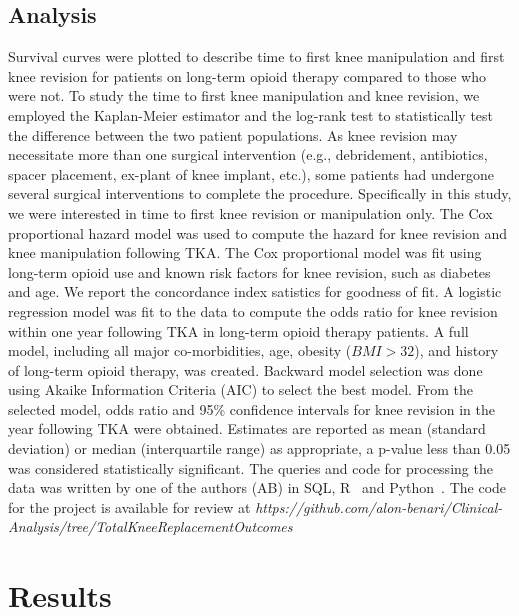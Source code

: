 \documentclass[a4paper]{article}
\begin{document}
\subsection*{Analysis}
Survival curves were plotted to describe time to first knee manipulation and first knee revision for patients on long-term opioid therapy compared to those who were not. To study the time to first knee manipulation and knee revision, we employed the Kaplan-Meier estimator and the log-rank test to statistically test the difference between the two patient populations. As knee revision may necessitate more than one surgical intervention (e.g., debridement, antibiotics, spacer placement, ex-plant of knee implant, etc.), some patients had undergone several surgical interventions to complete the procedure.  Specifically in this study, we were interested in time to first knee revision or manipulation only.
The Cox proportional hazard model was used to compute the hazard for knee revision and knee manipulation following TKA. The Cox proportional model was fit using long-term opioid use and known risk factors for knee revision, such as diabetes and age. We report the concordance index satistics for goodness of fit. A logistic regression model was fit to the data to compute the odds ratio for knee revision within one year following TKA in long-term opioid therapy patients.  
A full model, including all major co-morbidities, age, obesity ($BMI>32$), and history of long-term opioid therapy, was created. Backward model selection was done using Akaike Information Criteria (AIC) to select the best model. From the selected model, odds ratio and 95\% confidence intervals for knee revision in the year following TKA were obtained. Estimates are reported as mean (standard deviation) or median (interquartile range) as appropriate, a p-value less than 0.05 was considered statistically significant.
The queries and code for processing the data was written by one of the authors (AB) in  SQL, R~\cite{cran} and Python~\cite{python}. 
The code for the project is available for review at \textit{https://github.com/alon-benari/Clinical-Analysis/tree/TotalKneeReplacementOutcomes }

\section*{Results}
   
\end{document}
